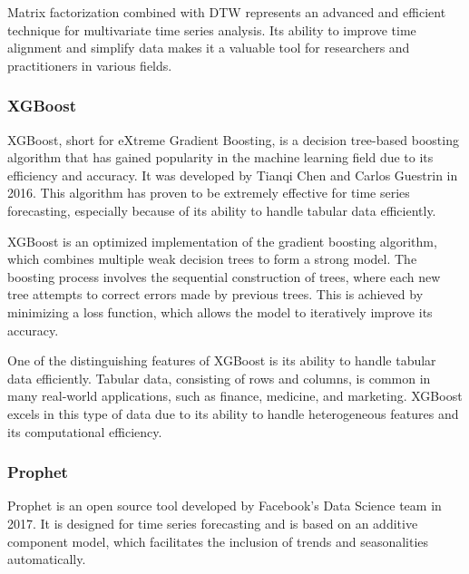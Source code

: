 Matrix factorization combined with DTW represents an advanced and efficient technique for multivariate time series analysis. Its ability to improve time alignment and simplify data makes it a valuable tool for researchers and practitioners in various fields.
\vspace{10pt}

\subsubsection{XGBoost}
XGBoost\cite{Chen_2016}, short for eXtreme Gradient Boosting, is a decision tree-based boosting algorithm that has gained popularity in the machine learning field due to its efficiency and accuracy. It was developed by Tianqi Chen and Carlos Guestrin in 2016. This algorithm has proven to be extremely effective for time series forecasting, especially because of its ability to handle tabular data efficiently.

XGBoost is an optimized implementation of the gradient boosting algorithm, which combines multiple weak decision trees to form a strong model. The boosting process involves the sequential construction of trees, where each new tree attempts to correct errors made by previous trees. This is achieved by minimizing a loss function, which allows the model to iteratively improve its accuracy.

One of the distinguishing features of XGBoost is its ability to handle tabular data efficiently. Tabular data, consisting of rows and columns, is common in many real-world applications, such as finance, medicine, and marketing. XGBoost excels in this type of data due to its ability to handle heterogeneous features and its computational efficiency.
\vspace{10pt}

\subsubsection{Prophet}
Prophet\cite{prophet} is an open source tool developed by Facebook's Data Science team in 2017. It is designed for time series forecasting and is based on an additive component model, which facilitates the inclusion of trends and seasonalities automatically.

